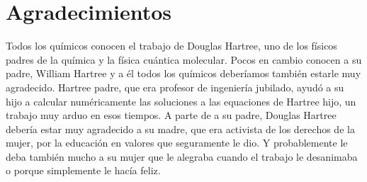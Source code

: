 \chapter*[Agradecimientos]{Agradecimientos}
Todos los químicos conocen el trabajo de Douglas Hartree, uno de los físicos padres de la química y 
la física cuántica molecular. Pocos en cambio conocen a su padre, William Hartree y a él todos los 
químicos deberíamos también estarle muy agradecido. Hartree padre, que era profesor de ingeniería 
jubilado, ayudó a su hijo a calcular numéricamente las soluciones a las equaciones de Hartree hijo, 
un trabajo muy arduo en esos tiempos. A parte de a su padre, Douglas Hartree debería estar muy 
agradecido a su madre, que era activista de los derechos de la mujer, por la educación en valores 
que seguramente le dio. Y probablemente le deba también mucho a su mujer que le alegraba cuando el 
trabajo le desanimaba o porque simplemente le hacía feliz. 

